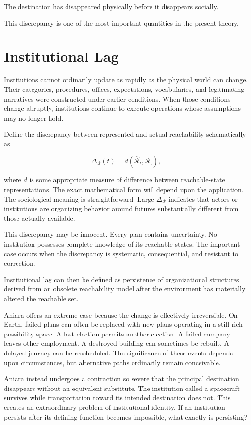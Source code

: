 \documentclass[11pt,oneside]{book}
\theoremstyle{definition}
\theoremstyle{remark}
\newcommand{\R}{\mathcal{R}}
\begin{document}
The destination has disappeared physically before it disappears socially.

This discrepancy is one of the most important quantities in the present theory.

\section{Institutional Lag}

Institutions cannot ordinarily update as rapidly as the physical world can change. Their categories, procedures, offices, expectations, vocabularies, and legitimating narratives were constructed under earlier conditions. When those conditions change abruptly, institutions continue to execute operations whose assumptions may no longer hold.

Define the discrepancy between represented and actual reachability schematically as

\[
\Delta_{\R}(t)
=
d\!\left(
\widehat{\R}_t,
\R_t
\right),
\]

where \(d\) is some appropriate measure of difference between reachable-state representations. The exact mathematical form will depend upon the application. The sociological meaning is straightforward. Large \(\Delta_{\R}\) indicates that actors or institutions are organizing behavior around futures substantially different from those actually available.

This discrepancy may be innocent. Every plan contains uncertainty. No institution possesses complete knowledge of its reachable states. The important case occurs when the discrepancy is systematic, consequential, and resistant to correction.

Institutional lag can then be defined as persistence of organizational structures derived from an obsolete reachability model after the environment has materially altered the reachable set.

Aniara offers an extreme case because the change is effectively irreversible. On Earth, failed plans can often be replaced with new plans operating in a still-rich possibility space. A lost election permits another election. A failed company leaves other employment. A destroyed building can sometimes be rebuilt. A delayed journey can be rescheduled. The significance of these events depends upon circumstances, but alternative paths ordinarily remain conceivable.

Aniara instead undergoes a contraction so severe that the principal destination disappears without an equivalent substitute. The institution called a spacecraft survives while transportation toward its intended destination does not. This creates an extraordinary problem of institutional identity. If an institution persists after its defining function becomes impossible, what exactly is persisting?
\end{document}
